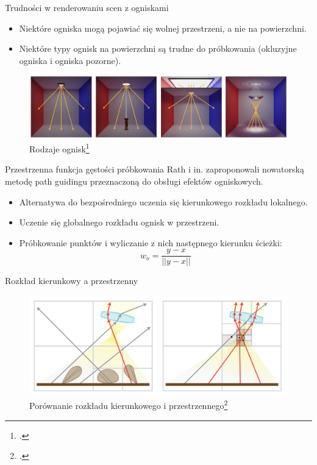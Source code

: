 \documentclass{beamer}
\begin{document}
\begin{frame}{Trudności w renderowaniu scen z ogniskami}
    \begin{itemize}
        \item Niektóre ogniska mogą pojawiać się wolnej przestrzeni, a nie na powierzchni.
        \item Niektóre typy ognisk na powierzchni są trudne do próbkowania (okluzyjne ogniska i ogniska pozorne).
    \end{itemize}
    \begin{figure}
        \centering
        \includegraphics[width=0.8\linewidth]{img/focal_effects.png}
        \caption{Rodzaje ognisk\footcite{Focal_Guiding}}
        \label{fig:enter-label}
    \end{figure}
\end{frame}
%

\begin{frame}{Przestrzenna funkcja gęstości próbkowania}
Rath i in. zaproponowali nowatorską metodę path guidingu przeznaczoną do obsługi efektów ogniskowych.
    \begin{itemize}
        \item Alternatywa do bezpośredniego uczenia się kierunkowego rozkładu lokalnego.
        \item Uczenie się globalnego rozkładu ognisk w przestrzeni.
        \item Próbkowanie punktów i wyliczanie z nich następnego kierunku ścieżki:
        $$ w_o = \frac{y-x}{||y-x||} $$
    \end{itemize}
\end{frame}

\begin{frame}{Rozkład kierunkowy a przestrzenny}
    \begin{figure}
        \centering
        \includegraphics[width=1\linewidth]{img/directional_vs_spatial.png}
        \caption{Porównanie rozkładu kierunkowego i przestrzennego\footcite{Focal_Guiding}}
        \label{fig:enter-label}
    \end{figure}
\end{frame}
\end{document}
